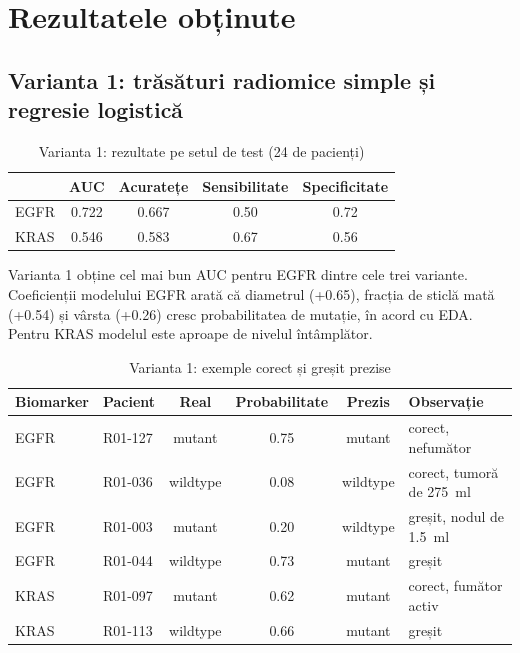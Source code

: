 \documentclass[runningheads,a4paper,11pt]{report}
\begin{document}
\section{Rezultatele obținute}

\subsection{Varianta 1: trăsături radiomice simple și regresie logistică}
\begin{table}[htbp]
    \centering
    \begin{tabular}{lcccc}
        \toprule
        & \textbf{AUC} & \textbf{Acuratețe} & \textbf{Sensibilitate} & \textbf{Specificitate} \\
        \midrule
        EGFR & 0.722 & 0.667 & 0.50 & 0.72 \\
        KRAS & 0.546 & 0.583 & 0.67 & 0.56 \\
        \bottomrule
    \end{tabular}
    \caption{Varianta 1: rezultate pe setul de test (24 de pacienți)}
    \label{tab:rez_v1}
\end{table}

Varianta 1 obține cel mai bun AUC pentru EGFR dintre cele trei variante. Coeficienții modelului EGFR arată că diametrul (+0.65), fracția de sticlă mată (+0.54) și vârsta (+0.26) cresc probabilitatea de mutație, în acord cu EDA. Pentru KRAS modelul este aproape de nivelul întâmplător.

\begin{table}[htbp]
    \centering
    \begin{tabular}{llcccl}
        \toprule
        \textbf{Biomarker} & \textbf{Pacient} & \textbf{Real} & \textbf{Probabilitate} & \textbf{Prezis} & \textbf{Observație} \\
        \midrule
        EGFR & R01-127 & mutant & 0.75 & mutant & corect, nefumător \\
        EGFR & R01-036 & wildtype & 0.08 & wildtype & corect, tumoră de 275~ml \\
        EGFR & R01-003 & mutant & 0.20 & wildtype & greșit, nodul de 1.5~ml \\
        EGFR & R01-044 & wildtype & 0.73 & mutant & greșit \\
        KRAS & R01-097 & mutant & 0.62 & mutant & corect, fumător activ \\
        KRAS & R01-113 & wildtype & 0.66 & mutant & greșit \\
        \bottomrule
    \end{tabular}
    \caption{Varianta 1: exemple corect și greșit prezise}
    \label{tab:ex_v1}
\end{table}
\end{document}
